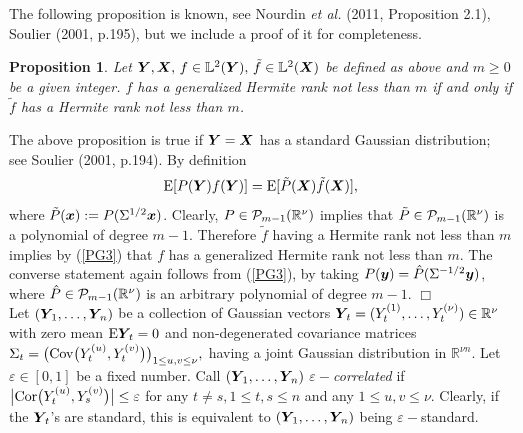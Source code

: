 \documentclass[10pt]{article}
\def\L{\mathbb{L}}
\def\R{\mathbb{R}}
\def\E{\mathrm E}
\newcommand{\mbf}[1]{\mbox{\boldmath $#1$}}
\newtheorem{prop}{Proposition}
\begin{document}
The following proposition is known, see Nourdin {\it et al.} (2011, Proposition 2.1),
 Soulier (2001, p.195), but we include a proof of it for completeness.



\begin{prop} \label{GHrank} Let ${\mbf Y},  {\mbf X}, \, f \in \L^2 ({\mbf Y}), \, \tilde f \in \L^2 ({\mbf X})$ be defined  as above and
$m \ge 0$ be a given integer. $f $ has a generalized Hermite rank not less than $m$ if and only if
$\tilde f$ has a Hermite rank not less than $m$.










\end{prop}





 The above proposition is true if ${\mbf Y} =  {\mbf X}$ has a standard Gaussian distribution;
see Soulier (2001, p.194). By definition
\begin{equation}\label{PG3}
\E [ P({\mbf Y}) f({\mbf Y}) ]  =  \E [ \tilde P({\mbf X}) \tilde f({\mbf X}) ],
\end{equation}
where
$\tilde P({\mbf x}) :=  P(\Sigma^{1/2} {\mbf x}) $.  Clearly,  $P  \in {\cal P}_{m-1}(\R^\nu)$ implies that
$\tilde  P   \in {\cal P}_{m-1}(\R^\nu)$ is a polynomial of degree $m-1$. Therefore
$\tilde f$ having a Hermite rank not less than $m$ implies by (\ref{PG3}) that  $f$ has a generalized Hermite rank not less than $m$.
The converse statement again follows from (\ref{PG3}), by taking $P({\mbf y}) = \hat P(\Sigma^{-1/2} {\mbf y})$, where
$\hat P \in {\cal P}_{m-1}(\R^\nu)$ is an arbitrary polynomial of degree $m-1$. \hfill $\Box$ \\





Let $({\mbf Y}_{\!1}, \dots, {\mbf Y}_{\!n})$ be a collection of
Gaussian vectors ${\mbf Y}_{\!t} = (Y^{(1)}_{t}, \dots,
Y^{(\nu)}_{t}) \in {\R}^{\nu} $ with zero mean $\E {\mbf Y}_{\!t} = 0 $ and non-degenerated covariance matrices
$\Sigma_t = \big({\rm Cov}\big(Y^{(u)}_{t}, Y^{(v)}_{t}\big)\big)_{1\le u,v\le \nu}, $
having a joint Gaussian distribution
in ${\R}^{\nu n}$. Let $\varepsilon \in [0,1]$ be a fixed number.
Call $({\mbf Y}_{\!1}, \dots, {\mbf Y}_{\!n})$
{\it $\varepsilon-$correlated} if $\big|{\rm Cor}\big(Y^{(u)}_{t}, Y^{(v)}_{s}\big)\big| \le
\varepsilon $ for any $t \neq s, 1\le t,s\le n$ and any $1\le u, v
\le \nu$. Clearly, if the ${\mbf Y}_{\!t}$'s are standard, this is equivalent to
 $({\mbf Y}_{\!1}, \dots, {\mbf Y}_{\!n})$ being
$\varepsilon-$standard.
\end{document}
